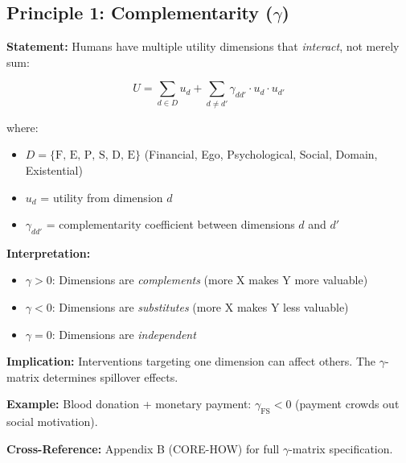 \subsection{Principle 1: Complementarity ($\gamma$)}

\begin{tcolorbox}[colback=gray!5!white, colframe=gray!75!black,
    title=Axiom PR-1: Complementarity]

\textbf{Statement:} Humans have multiple utility dimensions that \textit{interact}, not merely sum:

\begin{equation}
U = \sum_{d \in D} u_d + \sum_{d \neq d'} \gamma_{dd'} \cdot u_d \cdot u_{d'}
\label{eq:pr-complementarity}
\end{equation}

where:
\begin{itemize}[nosep]
    \item $D = \{\text{F, E, P, S, D, E}\}$ (Financial, Ego, Psychological, Social, Domain, Existential)
    \item $u_d$ = utility from dimension $d$
    \item $\gamma_{dd'}$ = complementarity coefficient between dimensions $d$ and $d'$
\end{itemize}

\textbf{Interpretation:}
\begin{itemize}[nosep]
    \item $\gamma > 0$: Dimensions are \textit{complements} (more X makes Y more valuable)
    \item $\gamma < 0$: Dimensions are \textit{substitutes} (more X makes Y less valuable)
    \item $\gamma = 0$: Dimensions are \textit{independent}
\end{itemize}

\textbf{Implication:} Interventions targeting one dimension can affect others. The $\gamma$-matrix determines spillover effects.

\textbf{Example:} Blood donation + monetary payment: $\gamma_{\text{FS}} < 0$ (payment crowds out social motivation).

\textbf{Cross-Reference:} Appendix B (CORE-HOW) for full $\gamma$-matrix specification.

\end{tcolorbox}


